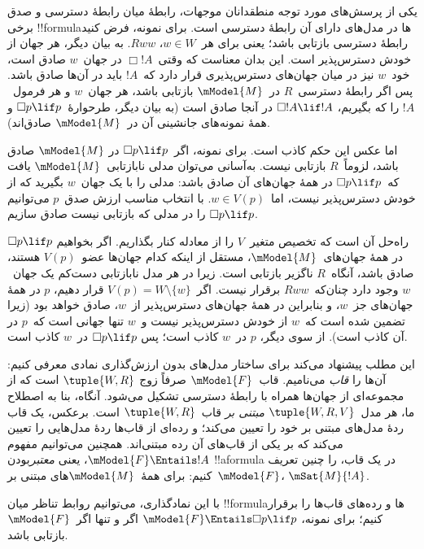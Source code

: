 \documentclass[../../../include/open-logic-section]{subfiles}
\begin{document}


یکی از پرسش‌های مورد توجه منطقدانان موجهات، رابطهٔ میان رابطهٔ دسترسی
و صدق برخی !!{formula}ها در مدل‌های دارای آن رابطهٔ دسترسی است. برای
نمونه، فرض کنید رابطهٔ دسترسی بازتابی باشد؛ یعنی برای هر~$w \in W$،
$Rww$. به بیان دیگر، هر جهان از خودش دسترس‌پذیر است. این بدان معناست
که وقتی~$\Box !A$ در جهان~$w$ صادق است، خود~$w$ نیز در میان جهان‌های
دسترس‌پذیری قرار دارد که~$!A$ باید در آن‌ها صادق باشد. پس اگر رابطهٔ
دسترسی~$R$ در~$\mModel{M}$ بازتابی باشد، هر جهان~$w$ و هر فرمول~$!A$
را که بگیریم، $\Box !A \lif !A$ در آنجا صادق است (به بیان دیگر،
طرحوارهٔ~$\Box p \lif p$ و همهٔ نمونه‌های جانشینی آن در~$\mModel{M}$
صادق‌اند).

اما عکس این حکم کاذب است. برای نمونه، اگر~$\Box p \lif p$ در
$\mModel{M}$ صادق باشد، لزوماً~$R$ بازتابی نیست. به‌آسانی می‌توان مدلی
نابازتابی~$\mModel{M}$ یافت که~$\Box p \lif p$ در همهٔ جهان‌های آن
صادق باشد: مدلی را با یک جهان~$w$ بگیرید که از خودش دسترس‌پذیر نیست،
اما~$w \in V(p)$. با انتخاب مناسب ارزش صدق~$p$ می‌توانیم
$\Box p \lif p$ را در مدلی که بازتابی نیست صادق سازیم.

راه‌حل آن است که تخصیص متغیر~$V$ را از معادله کنار بگذاریم. اگر بخواهیم
$\Box p \lif p$ در همهٔ جهان‌های~$\mModel{M}$، مستقل از اینکه کدام
جهان‌ها عضو~$V(p)$ هستند، صادق باشد، آنگاه~$R$ ناگزیر بازتابی است. زیرا
در هر مدل نابازتابی دست‌کم یک جهان~$w$ وجود دارد چنان‌که~$Rww$ برقرار
نیست. اگر~$V(p) = W \setminus \{w\}$ قرار دهیم، $p$ در همهٔ جهان‌های
جز~$w$، و بنابراین در همهٔ جهان‌های دسترس‌پذیر از~$w$، صادق خواهد بود
(زیرا تضمین شده است که~$w$ از خودش دسترس‌پذیر نیست و~$w$ تنها جهانی
است که~$p$ در آن کاذب است). از سوی دیگر، $p$ در~$w$ کاذب است؛ پس
$\Box p \lif p$ در~$w$ کاذب است.

این مطلب پیشنهاد می‌کند برای ساختار مدل‌های بدون ارزش‌گذاری نمادی
معرفی کنیم: آن‌ها را \emph{قاب} می‌نامیم. قاب~$\mModel{F}$ صرفاً زوج
$\tuple{W, R}$ است که از مجموعه‌ای از جهان‌ها همراه با رابطهٔ دسترسی
تشکیل می‌شود. آنگاه، بنا به اصطلاح ما، هر مدل~$\tuple{W, R, V}$
\emph{مبتنی بر} قاب~$\tuple{W, R}$ است. برعکس، یک قاب ردهٔ مدل‌های
مبتنی بر خود را تعیین می‌کند؛ و رده‌ای از قاب‌ها ردهٔ مدل‌هایی را تعیین
می‌کند که بر یکی از قاب‌های آن رده مبتنی‌اند. همچنین می‌توانیم مفهوم
$\mModel{F} \Entails !A$، یعنی \emph{معتبر}بودن !!a{formula} در یک قاب،
را چنین تعریف کنیم: برای همهٔ~$\mModel{M}$های مبتنی بر~$\mModel{F}$،
$\mSat{M}{!A}$.

با این نمادگذاری، می‌توانیم روابط تناظر میان !!{formula}ها و رده‌های
قاب‌ها را برقرار کنیم؛ برای نمونه، $\mModel{F} \Entails \Box p \lif p$
اگر و تنها اگر~$\mModel{F}$ بازتابی باشد.
\end{document}
